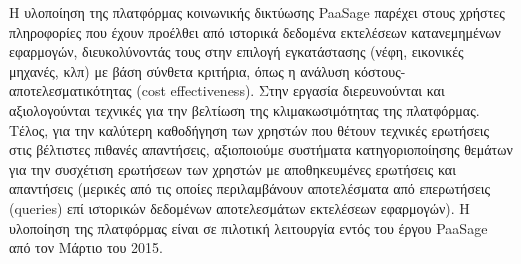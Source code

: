 \begin{titlepage}
Η υλοποίηση της πλατφόρμας κοινωνικής δικτύωσης PaaSage παρέχει στους χρήστες πληροφορίες που έχουν προέλθει από ιστορικά δεδομένα εκτελέσεων κατανεμημένων εφαρμογών, διευκολύνοντάς τους στην επιλογή εγκατάστασης (νέφη, εικονικές μηχανές, κλπ) με βάση σύνθετα κριτήρια, όπως η ανάλυση κόστους-αποτελεσματικότητας (cost effectiveness).  Στην εργασία διερευνούνται και αξιολογούνται τεχνικές για την βελτίωση της κλιμακωσιμότητας της πλατφόρμας. Τέλος, για την καλύτερη καθοδήγηση των χρηστών που θέτουν τεχνικές ερωτήσεις στις βέλτιστες πιθανές απαντήσεις, αξιοποιούμε συστήματα κατηγοριοποίησης θεμάτων για την συσχέτιση ερωτήσεων των χρηστών με αποθηκευμένες ερωτήσεις και απαντήσεις (μερικές από τις οποίες περιλαμβάνουν αποτελέσματα από επερωτήσεις (queries) επί ιστορικών δεδομένων αποτελεσμάτων εκτελέσεων εφαρμογών). Η υλοποίηση της πλατφόρμας είναι σε πιλοτική λειτουργία εντός του έργου PaaSage από τον Μάρτιο του 2015.



\vfill

\end{titlepage}

